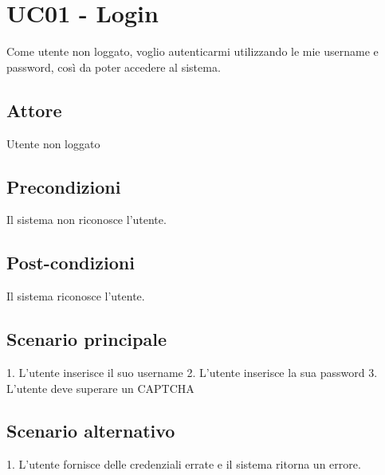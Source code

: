 \section{UC01 - Login}
Come utente non loggato, voglio autenticarmi utilizzando le mie username e password, così da poter accedere al sistema.
\subsection{Attore}
Utente non loggato
\subsection{Precondizioni}
Il sistema non riconosce l'utente.
\subsection{Post-condizioni}
Il sistema riconosce l'utente.
\subsection{Scenario principale}
1. L'utente inserisce il suo username
2. L'utente inserisce la sua password
3. L'utente deve superare un CAPTCHA
\subsection{Scenario alternativo}
1. L'utente fornisce delle credenziali errate e il sistema ritorna un errore.